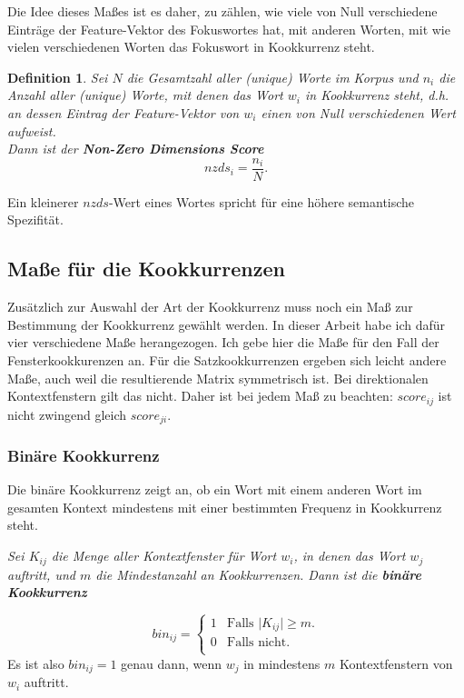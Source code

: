 \documentclass[11pt,numbers=noenddot]{scrartcl}
\newtheorem*{defi}{Definition}
\begin{document}
Die Idee dieses Maßes ist es daher, zu zählen, wie viele von Null verschiedene Einträge der Feature-Vektor des Fokuswortes hat, mit anderen Worten, mit wie vielen verschiedenen Worten das Fokuswort in Kookkurrenz steht.

\begin{defi}
Sei $N$ die Gesamtzahl aller (unique) Worte im Korpus und $n_i$ die Anzahl aller (unique) Worte, mit denen das Wort $w_i$ in Kookkurrenz steht, d.h. an dessen Eintrag der Feature-Vektor von $w_i$ einen von Null verschiedenen Wert aufweist. \\ Dann ist der \textbf{Non-Zero Dimensions Score}
\begin{equation}
    nzds_i = \frac{n_i}{N}.
\end{equation}
\end{defi}

Ein kleinerer $nzds$-Wert eines Wortes spricht für eine höhere semantische Spezifität.

\subsection{Maße für die Kookkurrenzen} \label{coocmeasures}

Zusätzlich zur Auswahl der Art der Kookkurrenz muss noch ein Maß zur Bestimmung der Kookkurrenz gewählt werden. In dieser Arbeit habe ich dafür vier verschiedene Maße herangezogen. Ich gebe hier die Maße für den Fall der Fensterkookkurenzen an. Für die Satzkookkurrenzen ergeben sich leicht andere Maße, auch weil die resultierende Matrix symmetrisch ist. Bei direktionalen Kontextfenstern gilt das nicht. Daher ist bei jedem Maß zu beachten: $score_{ij}$ ist nicht zwingend gleich $score_{ji}$.

\subsubsection{Binäre Kookkurrenz} \label{bin}

Die binäre Kookkurrenz zeigt an, ob ein Wort mit einem anderen Wort im gesamten Kontext mindestens mit einer bestimmten Frequenz in Kookkurrenz steht.

\emph{Sei $K_{ij}$ die Menge aller Kontextfenster für Wort $w_i$, in denen das Wort $w_j$ auftritt, und $m$ die Mindestanzahl an Kookkurrenzen. Dann ist die \textbf{binäre Kookkurrenz}}

\begin{equation*}
   bin_{ij} =
   \begin{cases}
        1 & \text{Falls |$K_{ij}| \ge m$.}\\
        0 & \text{Falls nicht.}\\
   \end{cases}
\end{equation*}
Es ist also $bin_{ij} = 1$ genau dann, wenn $w_j$ in mindestens $m$ Kontextfenstern von $w_i$ auftritt.
\end{document}
